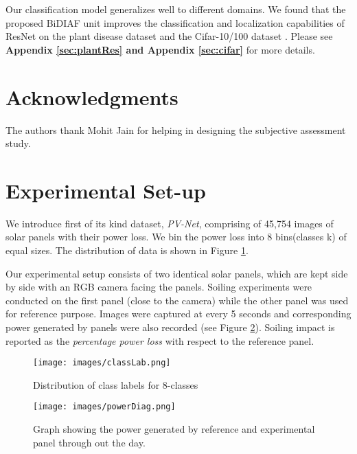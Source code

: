 \documentclass[10pt,twocolumn,letterpaper]{article}
\begin{document}
Our classification model generalizes well to different domains. We found that the proposed BiDIAF unit improves the classification and localization capabilities of ResNet on the plant disease dataset \cite{sladojevic2016deep} and the Cifar-10/100 dataset \cite{krizhevsky2009learning}. Please see \textbf{Appendix \ref{sec:plantRes} and Appendix \ref{sec:cifar}} for more details.

\vspace{-2mm}
\section*{Acknowledgments}
\vspace{-2mm}
The authors thank Mohit Jain for helping in designing the subjective assessment study. %

{\small


}

\clearpage

\appendix

\section{Experimental Set-up}
\label{sec:setup}
We introduce first of its kind dataset, \textit{PV-Net}, comprising of 45,754 images of solar panels with their power loss. We bin the power loss into 8 bins(classes k) of equal sizes. The distribution of data is shown in Figure \ref{fig:distribution}.

Our experimental setup consists of two identical solar panels, which are kept side by side with an RGB camera facing the panels. Soiling experiments were conducted on the first panel (close to the camera) while the other panel was used for reference purpose. Images were captured at every 5 seconds and corresponding power generated by panels were also recorded (see Figure \ref{fig:powerGen}). Soiling impact is reported as the \textit{percentage power loss} with respect to the reference panel. 
\begin{figure}[b!]
	\centering
	\texttt{[image: images/classLab.png]}
	\caption{Distribution of class labels for 8-classes}
	\label{fig:distribution}
\end{figure}

\begin{figure}[b!]
	\centering
	\texttt{[image: images/powerDiag.png]}
	\caption{Graph showing the power generated by reference and experimental panel through out the day.}
	\label{fig:powerGen}
\end{figure}
\end{document}
